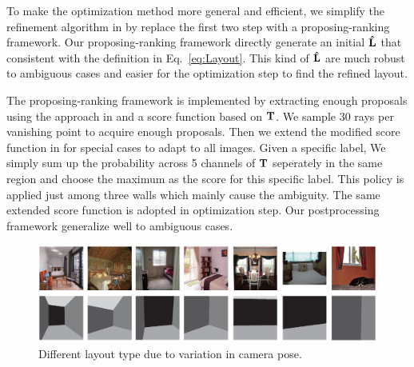 To make the optimization method more general and efficient, we simplify the refinement algorithm in \cite{dasgupta2016delay} by replace the first two step with a proposing-ranking framework. Our proposing-ranking framework directly generate an initial $\mathbf{\hat{L}}$ that consistent with the definition in Eq.~\ref{eq:Layout}. This kind of $\mathbf{\hat{L}}$ are much robust to ambiguous cases and easier for the optimization step to find the refined layout.

The proposing-ranking framework is implemented by extracting enough proposals using the approach in \cite{hedau2009recovering} and a score function based on $\mathbf{T}$. We sample 30 rays per vanishing point to acquire enough proposals. Then we extend the modified score function in \cite{dasgupta2016delay} for special cases to adapt to all images. Given a specific label, We simply sum up the probability across 5 channels of $\mathbf{T}$ seperately in the same region and choose the maximum as the score for this specific label. This policy is applied just among three walls which mainly cause the ambiguity. The same extended score function is adopted in optimization step. Our postprocessing framework generalize well to ambiguous cases.


\begin{figure}
	\centering
	\includegraphics[width=\columnwidth]{figure/different-layout-type.png}
	\caption{Different layout type due to variation in camera pose.  }
	\label{fig:different-layout-type}
\end{figure}